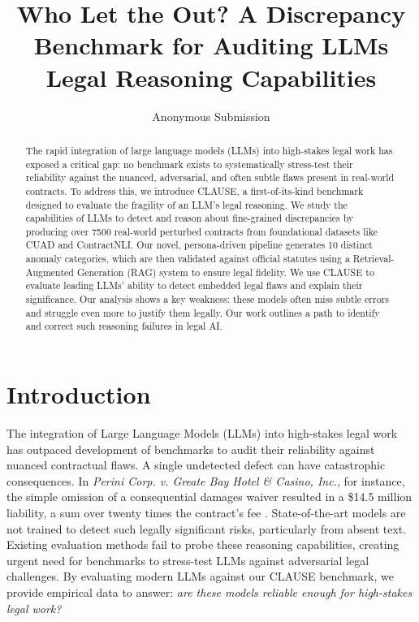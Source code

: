 \documentclass[11pt]{article}
\title{Who Let the \datasetName Out? A Discrepancy Benchmark for Auditing LLMs Legal Reasoning Capabilities}
\author{Anonymous Submission}
\newcommand{\datasetName}{{\sc CLAUSE}\xspace}
\begin{document}
\maketitle
\begin{abstract}
The rapid integration of large language models (LLMs) into high-stakes legal work has exposed a critical gap: no benchmark exists to systematically stress-test their reliability against the nuanced, adversarial, and often subtle flaws present in real-world contracts. To address this, we introduce CLAUSE, a first-of-its-kind benchmark designed to evaluate the fragility of an LLM's legal reasoning. We study the capabilities of LLMs to detect and reason about fine-grained discrepancies by producing over 7500 real-world perturbed contracts from foundational datasets like CUAD and ContractNLI. Our novel, persona-driven pipeline generates 10 distinct anomaly categories, which are then validated against official statutes using a Retrieval-Augmented Generation (RAG) system to ensure legal fidelity. We use CLAUSE to evaluate leading LLMs’ ability to detect embedded legal flaws and explain their significance. Our analysis shows a key weakness: these models often miss subtle errors and struggle even more to justify them legally. Our work outlines a path to identify and correct such reasoning failures in legal AI.

\end{abstract}

\section{Introduction}

The integration of Large Language Models (LLMs) into high-stakes legal work has outpaced development of benchmarks to audit their reliability against nuanced contractual flaws. A single undetected defect can have catastrophic consequences. In \textit{Perini Corp. v. Greate Bay Hotel \& Casino, Inc.}, for instance, the simple omission of a consequential damages waiver resulted in a \$14.5 million liability, a sum over twenty times the contract's fee \cite{mdmc-perini-2021}. State-of-the-art models are not trained to detect such legally significant risks, particularly from absent text. Existing evaluation methods fail to probe these reasoning capabilities, creating urgent need for benchmarks to stress-test LLMs against adversarial legal challenges. By evaluating modern LLMs against our \datasetName benchmark, we provide empirical data to answer: \emph{are these models reliable enough for high-stakes legal work?}
\end{document}
